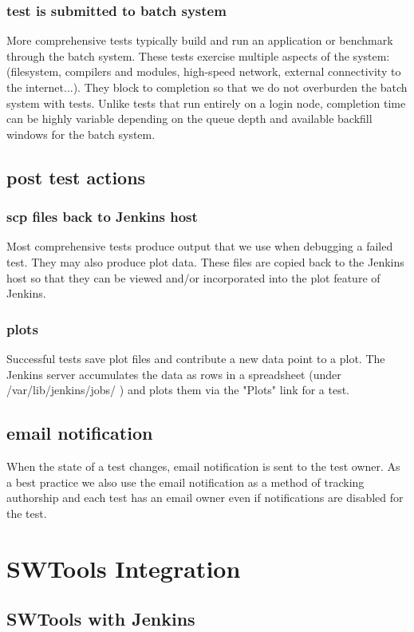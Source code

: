 \documentclass[10pt, conference, compsocconf]{IEEEtran}
\begin{document}
\subsubsection{test is submitted to batch system}
More comprehensive tests typically build and run an application or benchmark through the batch system.  These tests exercise multiple aspects of the system: (filesystem, compilers and modules, high-speed network, external connectivity to the internet...).  They block to completion so that we do not overburden the batch system with tests.  Unlike tests that run entirely on a login node, completion time can be highly variable depending on the queue depth and available backfill windows for the batch system.
\subsection{post test actions}
\subsubsection{scp files back to Jenkins host}
Most comprehensive tests produce output that we use when debugging a failed test.  They may also produce plot data.  These files are copied back to the Jenkins host so that they can be viewed and/or incorporated into the plot feature of Jenkins.
\subsubsection{plots}
Successful tests save plot files and contribute a new data point to a plot.  The Jenkins server accumulates the data as rows in a spreadsheet (under /var/lib/jenkins/jobs/ ) and plots them via the "Plots" link for a test.
\subsection{email notification}
When the state of a test changes, email notification is sent to the test owner.  As a best practice we also use the email notification as a method of tracking authorship and each test has an email owner even if notifications are disabled for the test.


\section{SWTools Integration}
\label{sec:SWToolsIntegration}
\subsection{SWTools with Jenkins}
\end{document}
